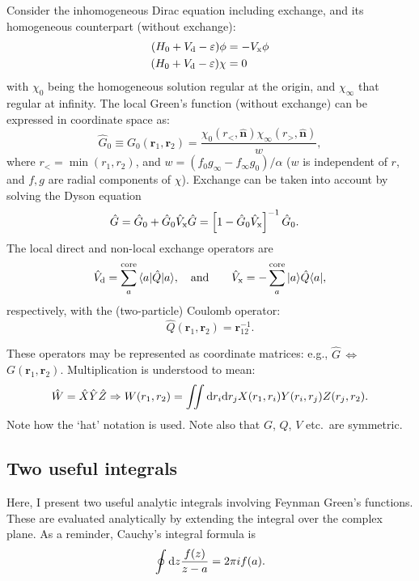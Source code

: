 \documentclass[10pt,twocolumn,a4paper]{article}%
\newcommand{\bra}[1]{\ensuremath{\langle #1|}}	%
\newcommand{\ket}[1]{\ensuremath{|#1\rangle}}	%
\renewcommand{\v}[1]{\ensuremath{\boldsymbol{#1}}}		%
\newcommand{\vhat}[1]{\ensuremath{\hat{\boldsymbol{#1}}}}		%
\newcommand{\be}{\begin{equation}}
\newcommand{\ee}{\end{equation}}
\def\d{\ensuremath{{\rm d}}}
\def\en{\ensuremath{\varepsilon}}
\begin{document}
Consider the inhomogeneous Dirac equation including exchange, and its homogeneous counterpart (without exchange):
\begin{align}
(H_0 + V_{\rm d} - \en)\phi &= -V_{\rm x}\phi \\
(H_0 + V_{\rm d} - \en)\chi &= 0
\end{align}
with $\chi_0$ being the homogeneous solution regular at the origin, and $\chi_\infty$ that regular at infinity.
The local Green's function (without exchange) can be expressed in coordinate space as:
\be
\hat G_0 \equiv  G_0(\v{r}_1,\v{r}_2) = \frac{\chi_0(r_<,\vhat{n})\chi_\infty(r_>,\vhat{n})}{w},
\label{eq:Green-direct}
\ee
where $r_<=\min(r_1,r_2)$, and $w=(f_0 g_\infty - f_\infty g_0)/\alpha$ ($w$ is independent of $r$, and $f,g$ are radial components of $\chi$).
Exchange can be taken into account by solving the Dyson equation~\cite{DzubaCPM1989plaEn,Abrikosov1965}
\begin{align}
\hat G &= \hat G_0 +  \hat G_0 \hat V_{\rm x}  \hat G = \left[ 1-  \hat G_0 \hat V_{\rm x}\right]^{-1}\hat G_0 .
\label{eq:Green-exchange}
\end{align}
The local direct and non-local exchange operators are
\begin{align}
\hat V_{\rm d} =  \sum_a^{\rm core}{\bra{a}\hat Q\ket{a}},
\quad\text{and}\qquad
\hat V_{\rm x} = - \sum_a^{\rm core}{\ket{a}\hat Q\bra{a}},
\end{align}
respectively, with the (two-particle) Coulomb operator:
\be\label{eq:CoulombOperator}
\hat Q(\v{r}_1,\v{r}_2) = \v{r}^{-1}_{12}.
\ee

These operators may be represented as coordinate matrices: e.g., $\hat G$\,$\Leftrightarrow$\,$G(\v{r}_1,\v{r}_2)$.
Multiplication is understood to mean:
 \[
 \hat W = \hat X \hat Y \hat Z \Rightarrow W(r_1, r_2) =  \iint \d r_i \d r_j X(r_1, r_i) Y(r_i, r_j) Z(r_j, r_2).
 \]
Note how the `hat' notation is used. %
Note also that $G$, $Q$, $V$ etc.\ are symmetric.

\subsection{Two useful integrals}

Here, I present two useful analytic integrals involving Feynman Green's functions.
These are evaluated analytically by extending the integral over the complex plane.
As a reminder, Cauchy's integral formula is
\[
\oint \d z \frac{f(z)}{z-a} = 2\pi i f(a).
\]
\end{document}

